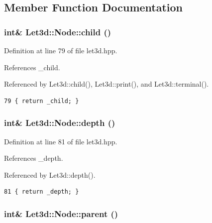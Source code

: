 \subsection{Member Function Documentation}
\subsubsection{\setlength{\rightskip}{0pt plus 5cm}int\& Let3d::Node::child ()\hspace{0.3cm}{\tt  [inline]}}\label{classLet3d_1_1Node_83bc185322633b777c975b4092a7786b_83bc185322633b777c975b4092a7786b}




Definition at line 79 of file let3d.hpp.

References \_\-child.

Referenced by Let3d::child(), Let3d::print(), and Let3d::terminal().

\footnotesize\begin{verbatim}79 { return _child; }
\end{verbatim}\normalsize 


\subsubsection{\setlength{\rightskip}{0pt plus 5cm}int\& Let3d::Node::depth ()\hspace{0.3cm}{\tt  [inline]}}\label{classLet3d_1_1Node_9a89dd5621b9f31341c798c701590c20_9a89dd5621b9f31341c798c701590c20}




Definition at line 81 of file let3d.hpp.

References \_\-depth.

Referenced by Let3d::depth().

\footnotesize\begin{verbatim}81 { return _depth; }
\end{verbatim}\normalsize 


\subsubsection{\setlength{\rightskip}{0pt plus 5cm}int\& Let3d::Node::parent ()\hspace{0.3cm}{\tt  [inline]}}\label{classLet3d_1_1Node_a655461eccb9740e4a07928a1e593cdf_a655461eccb9740e4a07928a1e593cdf}




